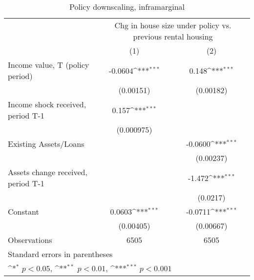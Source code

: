 \begin{table}[htbp]\centering
\def\sym#1{\ifmmode^{#1}\else\(^{#1}\)\fi}
\caption{Policy downscaling, inframarginal}
\begin{tabular}{l*{2}{c}}
\hline\hline
                    &\multicolumn{2}{c}{Chg in house size under policy vs. previous rental housing}\\\cmidrule(lr){2-3}
                    &\multicolumn{1}{c}{(1)}         &\multicolumn{1}{c}{(2)}         \\
\hline
Income value, T (policy period)&     -0.0604\sym{***}&       0.148\sym{***}\\
                    &   (0.00151)         &   (0.00182)         \\
Income shock received, period T-1&       0.157\sym{***}&                     \\
                    &  (0.000975)         &                     \\
Existing Assets/Loans&                     &     -0.0600\sym{***}\\
                    &                     &   (0.00237)         \\
Assets change received, period T-1&                     &      -1.472\sym{***}\\
                    &                     &    (0.0217)         \\
Constant            &      0.0603\sym{***}&     -0.0711\sym{***}\\
                    &   (0.00405)         &   (0.00667)         \\
\hline
Observations        &        6505         &        6505         \\
\hline\hline
\multicolumn{3}{l}{\footnotesize Standard errors in parentheses}\\
\multicolumn{3}{l}{\footnotesize \sym{*} \(p<0.05\), \sym{**} \(p<0.01\), \sym{***} \(p<0.001\)}\\
\end{tabular}
\end{table}
